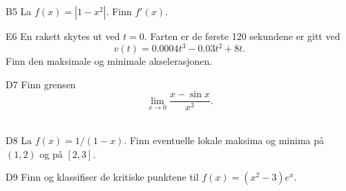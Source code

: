 \documentclass[a4paper,norsk,11pt]{interaktiv}
\begin{document}
\begin{oppgave}{B5}
  La $ f(x)=|1-x^2|.  $ Finn $f'(x)$.
  \\[-6pt]
\end{oppgave}


\begin{oppgave}{E6}
  En rakett skytes ut ved $t=0$. Farten er de første 120 sekundene er gitt ved 
  \begin{equation*}
    v(t)=0.0004t^3-0.03t^2+8t.
  \end{equation*}
  Finn den maksimale og minimale akselerasjonen. 
  \\[-6pt]
\end{oppgave}

\begin{oppgave}{D7}
  Finn grensen
  \begin{equation*}
    \lim_{x \to 0}\frac{x - \sin x}{x^3}.
  \end{equation*}
  \\[-6pt]
\end{oppgave}

\begin{oppgave}{D8}
  La $f(x) = 1/(1 - x)$. Finn eventuelle lokale maksima og
  minima på $(1,2)$ og på $[2,3]$. \\[-6pt]
\end{oppgave}

\begin{oppgave}{D9}
  Finn og klassifiser de kritiske punktene til $f(x ) =(x^2 - 3) e^x$.
  \\[-6pt]
\end{oppgave}
\end{document}
